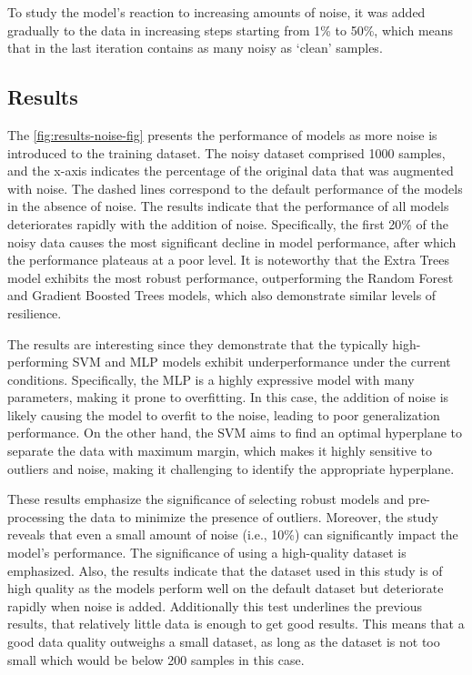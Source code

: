 To study the model's reaction to increasing amounts of noise, it was added
gradually to the data in increasing steps starting from 1\% to 50\%, which means that in the
last iteration contains as many noisy as `clean' samples.

\subsection{Results}\label{subsec:results-robustness}
The \cref{fig:results-noise-fig} presents the performance of models as more noise is introduced to the training
dataset.
The noisy dataset comprised 1000 samples, and the x-axis indicates the percentage of the original data that
was augmented with noise.
The dashed lines correspond to the default performance of the models in the absence of noise.
The results indicate that the performance of all models deteriorates rapidly with the addition of noise.
Specifically, the first 20\% of the noisy data causes the most significant decline in model performance, after which the
performance plateaus at a poor level.
It is noteworthy that the Extra Trees model exhibits the most robust performance, outperforming the Random Forest
and Gradient Boosted Trees models, which also demonstrate similar levels of resilience.

The results are interesting since they demonstrate that the typically high-performing SVM and MLP models
exhibit underperformance under the current conditions.
Specifically, the MLP is a highly expressive model with many parameters, making it prone to overfitting.
In this case, the addition of noise is likely causing the model to overfit to the noise, leading to poor
generalization performance.
On the other hand, the SVM aims to find an optimal hyperplane to separate the data with maximum margin, which makes
it highly sensitive to outliers and noise, making it challenging to identify the appropriate hyperplane.

These results emphasize the significance of selecting robust models and pre-processing the data to minimize the
presence of outliers.
Moreover, the study reveals that even a small amount of noise (i.e., 10\%) can significantly impact the model's
performance.
The significance of using a high-quality dataset is emphasized.
Also, the results indicate that the dataset used in this study is of high quality as the models perform well on the
default dataset but deteriorate rapidly when noise is added.
Additionally this test underlines the previous results, that relatively little data is enough to get good results.
This means that a good data quality outweighs a small dataset, as long as the dataset is not too small which would
be below 200 samples in this case.


